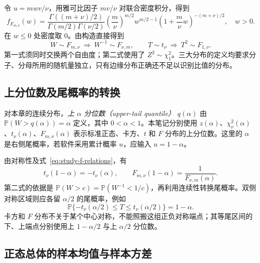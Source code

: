 令 $u=mwv/\nu$，用雅可比因子 $mv/\nu$ 对联合密度积分，得到
\begin{equation}
  f_{F_{m,\nu}}(w)
  =\frac{\Gamma((m+\nu)/2)}{\Gamma(m/2)\Gamma(\nu/2)}
    \left(\frac m\nu\right)^{m/2}
    w^{m/2-1}\left(1+\frac m\nu w\right)^{-(m+\nu)/2},
  \quad w>0.
  \label{eq:study-f-density}
\end{equation}
在 $w\le0$ 处密度取 $0$。由构造直接得到
\begin{equation}
  W\sim F_{m,\nu}\ \Longrightarrow\ W^{-1}\sim F_{\nu,m},
  \qquad
  T\sim t_\nu\ \Longrightarrow\ T^2\sim F_{1,\nu}.
  \label{eq:study-f-relations}
\end{equation}
第一式须同时交换两个自由度；第二式使用了 $Z^2\sim\chi^2_1$。三大分布的定义均要求分子、分母所用的随机量独立，只有边缘分布正确还不足以识别比值的分布。

\subsection{上分位数及尾概率的转换}

对本章的连续分布，\emph{上 $\alpha$ 分位数（upper-tail quantile）} $q(\alpha)$ 由 $\mathbb P(W>q(\alpha))=\alpha$ 定义，其中 $0<\alpha<1$。本笔记分别使用 $z(\alpha)$、$\chi^2_\nu(\alpha)$、$t_\nu(\alpha)$、$F_{m,\nu}(\alpha)$ 表示标准正态、卡方、$t$ 和 $F$ 分布的上分位数。这里的 $\alpha$ 是右侧尾概率，若软件采用累计概率 $u$，应输入 $u=1-\alpha$。

由对称性及式~\eqref{eq:study-f-relations}，有
\begin{equation}
  t_\nu(1-\alpha)=-t_\nu(\alpha),\qquad
  F_{m,\nu}(1-\alpha)=\frac1{F_{\nu,m}(\alpha)}.
  \label{eq:study-upper-quantile-conversion}
\end{equation}
第二式的依据是 $\mathbb P(W>c)=\mathbb P(W^{-1}<1/c)$，再利用连续性转换尾概率。双侧对称区域则应各留 $\alpha/2$ 的尾概率，例如
\[
  \mathbb P\{-t_\nu(\alpha/2)\le T\le t_\nu(\alpha/2)\}=1-\alpha.
\]
卡方和 $F$ 分布不关于某个中心对称，不能照搬这组正负对称端点；其等尾区间的下、上端点分别使用上 $1-\alpha/2$ 与上 $\alpha/2$ 分位数。

\subsection{正态总体的样本均值与样本方差}

